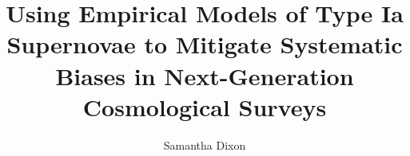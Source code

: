 \documentclass{ucbthesis}
\begin{document}

\title{Using Empirical Models of Type Ia Supernovae to Mitigate Systematic Biases in Next-Generation Cosmological Surveys}
\author{Samantha Dixon}


\maketitle
\approvalpage
\copyrightpage


\end{document}
